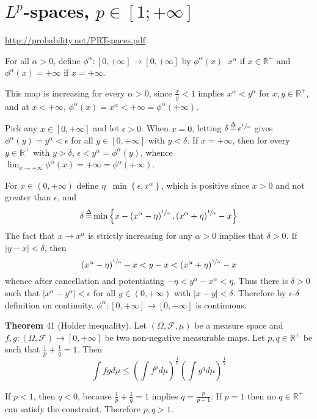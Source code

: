\documentclass[a4paper]{article}
\newcommand{\obj}[1]{\left\{ #1 \right \}}
\newcommand{\clo}[1]{\left [ #1 \right ]}
\newcommand{\brac}[1]{\left ( #1 \right )}
\newcommand{\abs}[1]{\left | #1 \right |}
\newcommand{\Real}{\mathbb{R}}
\newcommand{\Zinf}{\clo{ 0, +\infty }}
\newcommand{\Fcal}{\mathcal{F}}
\newcommand{\defn}{\mathop{\overset{\Delta}{=}}\nolimits}
\begin{document}

\section{$L^p$-spaces, $p\in \clo{1;+\infty}$} %
\label{sec:tut_9}
\url{http://probability.net/PRTspaces.pdf}

For all $\alpha>0$, define $\phi^\alpha:\Zinf\to\Zinf$ by $\phi^\alpha\brac{x}\defn x^\alpha$ if $x\in \Real^+$ and $\phi^\alpha\brac{x} = +\infty$ if $x=+\infty$.

This map is increasing for every $\alpha>0$, since $\frac{x}{y}<1$ implies $x^\alpha<y^\alpha$ for $x,y\in \Real^+$, and at $x<+\infty$, $\phi^\alpha\brac{x} = x^\alpha<+\infty = \phi^\alpha\brac{+\infty}$.

Pick any $x\in \Zinf$ and let $\epsilon>0$. When $x=0$, letting $\delta\defn\epsilon^{\sfrac{1}{\alpha}}$ gives $\phi^\alpha\brac{y} = y^\alpha < \epsilon$ for all $y\in\Zinf$ with $y<\delta$. If $x=+\infty$, then for every $y\in \Real^+$ with $y>\delta$, $\epsilon< y^\alpha=\phi^\alpha\brac{y}$, whence $\lim_{x\to+\infty} \phi^\alpha\brac{x} = +\infty = \phi^\alpha\brac{+\infty}$.

For $x\in \brac{0,+\infty}$ define $\eta\defn \min\obj{\epsilon, x^\alpha}$, which is positive since $x>0$ and not greater than $\epsilon$, and \[\delta\defn \min\obj{ x-\brac{x^\alpha-\eta}^{\sfrac{1}{\alpha}}, \brac{x^\alpha+\eta}^{\sfrac{1}{\alpha}}-x }\] The fact that $x\to x^\alpha$ is strictly increasing for any $\alpha>0$ implies that $\delta>0$. If $\abs{y-x}<\delta$, then \[\brac{x^\alpha-\eta}^{\sfrac{1}{\alpha}}-x<y-x<\brac{x^\alpha+\eta}^{\sfrac{1}{\alpha}}-x\] whence after cancellation and potentiating $-\eta<y^\alpha-x^\alpha<\eta$. Thus there is $\delta>0$ such that $\abs{x^\alpha-y^\alpha}<\epsilon$ for all $y\in\brac{0,+\infty}$ with $\abs{x-y}<\delta$. Therefore by $\epsilon$-$\delta$ definition on continuity, $\phi^\alpha:\Zinf\to\Zinf$ is continuous.

\label{thm:holder} \noindent \textbf{Theorem} 41 (Holder inequality).
Let $\brac{\Omega, \Fcal, \mu}$ be a measure space and $f,g:\brac{\Omega, \Fcal}\to \Zinf$ be two non-negative measurable maps. Let $p,q\in \Real^+$ be such that $\frac{1}{p}+\frac{1}{q}=1$. Then\[\int f g d\mu \leq \brac{ \int f^p d\mu }^\frac{1}{p} \brac{ \int g^q d\mu }^\frac{1}{q}\]

If $p<1$, then $q<0$, because $\frac{1}{p}+\frac{1}{q}=1$ implies $q=\frac{p}{p-1}$. If $p=1$ then no $q\in \Real^+$ can satisfy the constraint. Therefore $p,q>1$.
\end{document}
